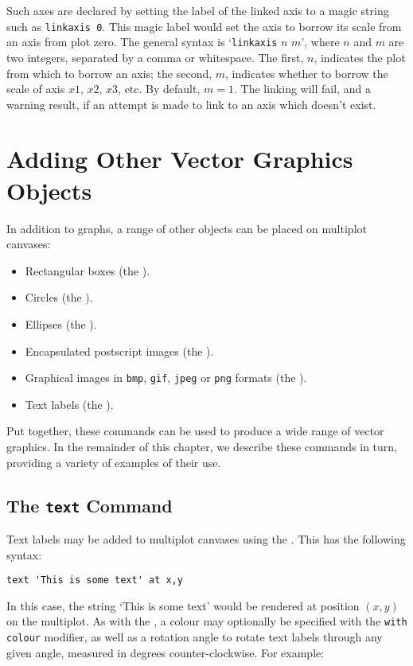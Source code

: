 Such axes are declared by setting the label of the linked axis to a magic
string such as {\tt linkaxis 0}\label{sec:linked_axes}. This magic label would set the axis to borrow
its scale from an axis from plot zero. The general syntax is `{\tt linkaxis}
$n$ $m$', where $n$ and $m$ are two integers, separated by a comma or
whitespace. The first, $n$, indicates the plot from which to borrow an axis;
the second, $m$, indicates whether to borrow the scale of axis $x1$, $x2$,
$x3$, etc. By default, $m=1$. The linking will fail, and a warning result, if
an attempt is made to link to an axis which doesn't exist.

\section{Adding Other Vector Graphics Objects}

In addition to graphs, a range of other objects can be placed on multiplot
canvases:
\begin{itemize}
\item Rectangular boxes (the ).
\item Circles (the ).
\item Ellipses (the ).
\item Encapsulated postscript images (the ).
\item Graphical images in {\tt bmp}, {\tt gif}, {\tt jpeg} or {\tt png} formats (the ).
\item Text labels (the ).
\end{itemize}
Put together, these commands can be used to produce a wide range of vector
graphics. In the remainder of this chapter, we describe these commands in turn,
providing a variety of examples of their use.

\subsection{The {\tt text} Command}

Text labels may be added to multiplot canvases using the . This
has the following syntax:

\begin{verbatim}
text 'This is some text' at x,y
\end{verbatim}

In this case, the string `This is some text' would be rendered at position
$(x,y)$ on the multiplot. As with the , a colour may
optionally be specified with the {\tt with colour} modifier, as well as a
rotation angle to rotate text labels through any given angle, measured in
degrees counter-clockwise. For example:

